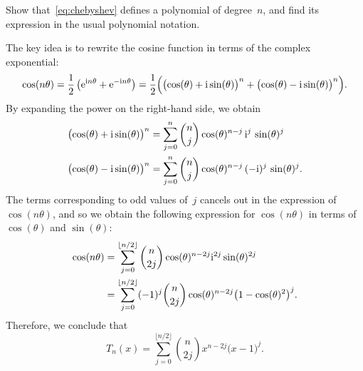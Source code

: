 \begin{exercise}
    \label{exercise:chebyshev}
    Show that~\eqref{eq:chebyshev} defines a polynomial of degree~$n$,
    and find its expression in the usual polynomial notation.
\end{exercise}
\begin{solution}
    The key idea is to rewrite the cosine function in terms of the complex exponential:
    \[
        \cos (n \theta) = \frac{1}{2}\left( \mathrm e^{\mathrm i n \theta} + \mathrm e^{-\mathrm i n \theta} \right)
            = \frac{1}{2}\Bigl( \bigl(\cos(\theta) + \mathrm i \sin (\theta)\bigr)^n + \bigl(\cos(\theta) - \mathrm i \sin (\theta)\bigr)^n \Bigr).
    \]
    By expanding the power on the right-hand side,
    we obtain
    \begin{align*}
        \bigl( \cos (\theta) + \mathrm i \sin (\theta) \bigr)^n
        &= \sum_{j=0}^{n} \binom{n}{j} \cos(\theta)^{n-j}  \, \mathrm i^{j} \, \sin(\theta)^{j} \\
        \bigl( \cos (\theta) - \mathrm i \sin (\theta) \bigr)^n
        &= \sum_{j=0}^{n} \binom{n}{j} \cos(\theta)^{n-j}  \, (-\mathrm i)^{j} \, \sin(\theta)^{j}.
    \end{align*}
    The terms corresponding to odd values of~$j$ cancels out in the expression of $\cos(n \theta)$,
    and so we obtain the following expression for $\cos(n \theta)$ in terms of $\cos(\theta)$ and $\sin(\theta)$:
    \begin{align*}
        \cos (n \theta)
        &= \sum_{j=0}^{\lfloor n/2 \rfloor} \binom{n}{2j} \cos(\theta)^{n-2j}  \mathrm i^{2j} \sin(\theta)^{2j} \\
        &= \sum_{j=0}^{\lfloor n/2 \rfloor} (-1)^j \binom{n}{2j} \cos(\theta)^{n-2j}   \bigl(1 - \cos(\theta)^2\bigr)^j.
    \end{align*}
    Therefore,
    we conclude that
    \begin{equation}
        \label{eq:expression_chebyshev}
        T_n(x) = \sum_{j=0}^{\lfloor n/2 \rfloor} \binom{n}{2j} x^{n-2j}   \bigl(x - 1\bigr)^j.
    \end{equation}
\end{solution}

